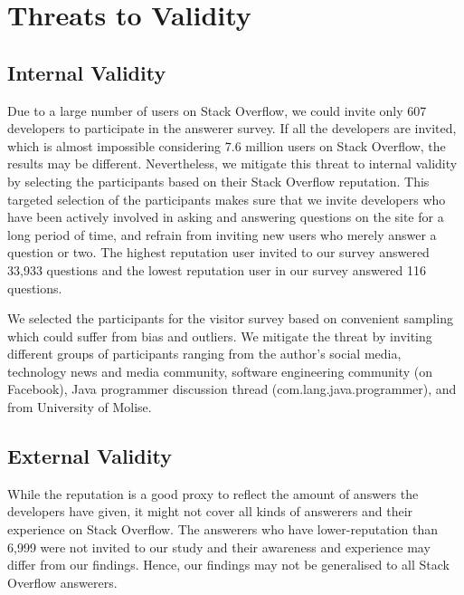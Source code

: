 \documentclass{svjour3}                     %
\begin{document}
\vspace{0.5cm} \noindent{} \vspace{0.5cm}

\section{Threats to Validity}

\subsection{Internal Validity}
Due to a large number of users on Stack Overflow, we could invite only 607
developers to participate in the answerer survey. If all the developers are
invited, which is almost impossible considering 7.6 million users on Stack
Overflow, the results may be different. Nevertheless, we mitigate this threat to
internal validity by selecting the participants based on their Stack Overflow
reputation. This targeted selection of the participants makes sure that we
invite developers who have been actively involved in asking and answering
questions on the site for a long period of time, and refrain from inviting new
users who merely answer a question or two. The highest reputation user invited
to our survey answered 33,933 questions and the lowest reputation user in our
survey answered 116 questions.

We selected the participants for the visitor survey based on convenient sampling
which could suffer from bias and outliers. We mitigate the threat by inviting
different groups of participants ranging from the author's social media,
technology news and media community, software engineering community (on
Facebook), Java programmer discussion thread (com.lang.java.programmer), and
from University of Molise.
 

\subsection{External Validity} 
While the reputation is a good proxy to reflect the amount of answers the
developers have given, it might not cover all kinds of answerers and their
experience on Stack Overflow. The answerers who have lower-reputation than 6,999
were not invited to our study and their awareness and experience may differ from
our findings. Hence, our findings may not be generalised to all Stack Overflow
answerers.
\end{document}
